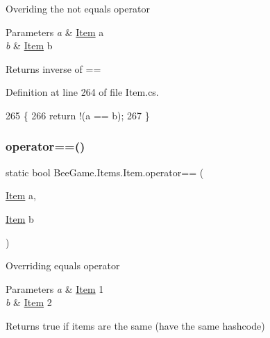 Overiding the not equals operator 


\begin{DoxyParams}{Parameters}
{\em a} & \hyperlink{struct_bee_game_1_1_items_1_1_item}{Item} a\\
\hline
{\em b} & \hyperlink{struct_bee_game_1_1_items_1_1_item}{Item} b\\
\hline
\end{DoxyParams}
\begin{DoxyReturn}{Returns}
inverse of ==
\end{DoxyReturn}


Definition at line 264 of file Item.\+cs.


\begin{DoxyCode}
265         \{
266             \textcolor{keywordflow}{return} !(a == b);
267         \}
\end{DoxyCode}
\mbox{\label{struct_bee_game_1_1_items_1_1_item_a33e02e23b17caf1ab0f6ff9c6ee3dd89}} 
\subsubsection{\texorpdfstring{operator==()}{operator==()}}
{\footnotesize\ttfamily static bool Bee\+Game.\+Items.\+Item.\+operator== (\begin{DoxyParamCaption}\item[{\hyperlink{struct_bee_game_1_1_items_1_1_item}{Item}}]{a,  }\item[{\hyperlink{struct_bee_game_1_1_items_1_1_item}{Item}}]{b }\end{DoxyParamCaption})\hspace{0.3cm}{\ttfamily [static]}}



Overriding equals operator 


\begin{DoxyParams}{Parameters}
{\em a} & \hyperlink{struct_bee_game_1_1_items_1_1_item}{Item} 1\\
\hline
{\em b} & \hyperlink{struct_bee_game_1_1_items_1_1_item}{Item} 2\\
\hline
\end{DoxyParams}
\begin{DoxyReturn}{Returns}
true if items are the same (have the same hashcode)
\end{DoxyReturn}


